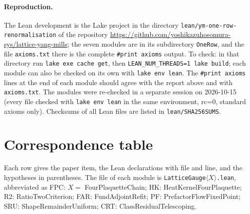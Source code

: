 \documentclass[11pt,a4paper]{article}
\theoremstyle{definition}
\theoremstyle{remark}
\newcommand{\code}[1]{\texttt{#1}}
\begin{document}
\paragraph{Reproduction.}
The Lean development is the Lake project in the directory \code{lean/\allowbreak{}ym-one-row-renormalisation} of the repository \url{https://github.com/yoshikazuhosomura-sys/lattice-yang-mills}; the seven modules are in its subdirectory \code{OneRow}, and the file \code{axioms.txt} there is the complete \code{\#print axioms} output.
To check: in that directory run \code{lake exe cache get}, then \code{LEAN\_NUM\_THREADS=1 lake build}; each module can also be checked on its own with \code{lake env lean}. The \code{\#print axioms} lines at the end of each module should agree with the report above and with \code{axioms.txt}.
The modules were re-checked in a separate session on 2026-10-15 (every file checked with \code{lake env lean} in the same environment, rc=0, standard axioms only).
Checksums of all Lean files are listed in \code{lean/SHA256SUMS}.



\fussy
\section{Correspondence table}\label{sec:corr}

Each row gives the paper item, the Lean declarations with file and line, and the hypotheses in parentheses. The file of each module is \code{LatticeGauge}$\langle X\rangle$\code{.lean}, abbreviated as FPC: $X=$ FourPlaquetteChain; HK: HeatKernelFourPlaquette; R2: RatioTwoCriterion; FAR: FundAdjointRefit; PF: PrefactorFlowFixedPoint; SRU: ShapeRemainderUniform; CRT: ClassResidualTelescoping.
\end{document}
